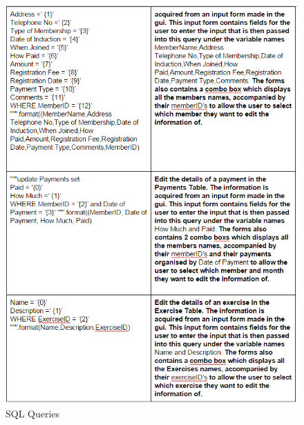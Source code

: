 \begin{itemize}
\begin{figure}[H]
    \includegraphics[width=\textwidth]{Queries2.PNG}
    \caption{SQL Queries} \label{fig:SQL Queries}
\end{figure}


\end{itemize}
